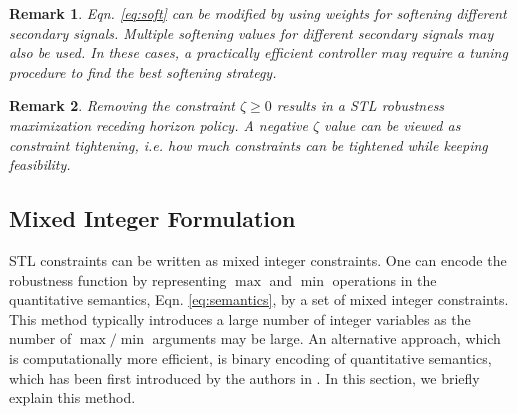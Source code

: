 \documentclass[letterpaper, 10 pt, conference]{ieeeconf}
\newtheorem{remark}{Remark}
\begin{document}
\begin{remark}
Eqn. \eqref{eq:soft} can be modified by using weights for softening different secondary signals. Multiple softening values for different secondary signals may also be used. In these cases, a practically efficient controller may require a tuning procedure to find the best softening strategy. 
\end{remark}

\begin{remark}
Removing the constraint $\zeta \geq 0$ results in a STL robustness maximization receding horizon policy. A negative $\zeta$ value can be viewed as \emph{constraint tightening}, i.e. how much constraints can be tightened while keeping feasibility. 
\end{remark}





\subsection{Mixed Integer Formulation}
STL constraints can be written as mixed integer constraints. One can encode the robustness function by representing $\max$ and $\min$ operations in the quantitative semantics, Eqn. \eqref{eq:semantics}, by a set of mixed integer constraints. This method typically introduces a large number of integer variables as the number of $\max/\min$ arguments may be large. An alternative approach, which is computationally more efficient, is binary encoding of quantitative semantics, which has been first introduced by the authors in \cite{raman}. In this section, we briefly explain this method.
\end{document}
